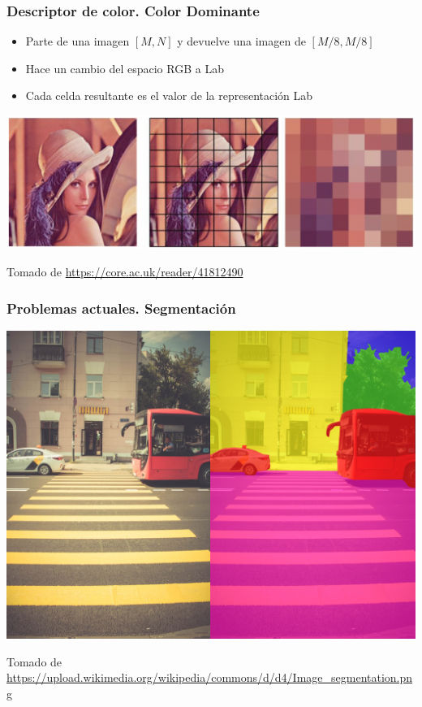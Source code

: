 \documentclass[
10pt, %
aspectratio=169, %
]{beamer}
\begin{document}
	\begin{frame}
		
		\frametitle{Descriptor de color. Color Dominante}
		
		\begin{itemize}
			\item Parte de una imagen $[M, N]$ y devuelve una imagen de $[M/8, M/8]$
			\item Hace un cambio del espacio RGB a Lab
			\item Cada celda resultante es el valor de la representación Lab
		\end{itemize}
		
		\vspace{1\baselineskip}
		\pause
		\centering
		\includegraphics[scale=0.45]{dlc.png} 
		
		{\scriptsize Tomado de \url{https://core.ac.uk/reader/41812490}}
		
	\end{frame}
	
	\begin{frame}
		
		\frametitle{Problemas actuales. Segmentación}
		
		\centering
		\includegraphics[scale=0.14]{segmentacion.png} 
		
		{\scriptsize Tomado de \url{https://upload.wikimedia.org/wikipedia/commons/d/d4/Image_segmentation.png}}
		
	\end{frame}
	
\end{document}
